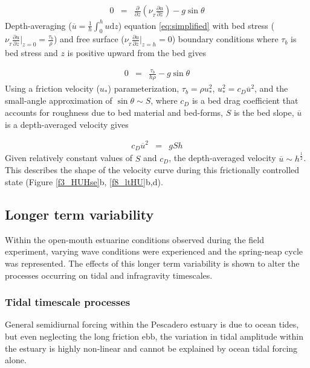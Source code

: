 \begin{eqnarray}
0 & = & \frac{\partial}{\partial z}\left(\nu_{_{T}}\frac{\partial u}{\partial z}\right)-g\sin\theta\label{eq:simplified}
\end{eqnarray}
Depth-averaging ($\overline{u}=\frac{1}{h}\int_{0}^{h}u\mathrm{d}z$)
equation \ref{eq:simplified} with bed stress ($\nu_{_{T}}\frac{\partial u}{\partial z}\Bigr|_{z=0}=\frac{\tau_{b}}{\rho}$)
and free surface ($\nu_{_{T}}\frac{\partial u}{\partial z}\Bigr|_{z=h}=0$)
boundary conditions where $\tau_{b}$ is bed stress and $z$ is positive
upward from the bed gives

\begin{eqnarray}
0 & = & \frac{\tau_{b}}{h\rho}-g\sin\theta\label{eq:fc_w_taubed}
\end{eqnarray}
Using a friction velocity ($u_{*}$) parameterization, $\tau_{b}=\rho u_{*}^{2}$,
$u_{*}^{2}=c_{D}\overline{u}^{2}$, and the small-angle approximation
of $\sin\theta\sim S$, where $c_{D}$ is a bed drag coefficient that
accounts for roughness due to bed material and bed-forms, $S$ is
the bed slope, $\overline{u}$ is a depth-averaged velocity gives

\begin{eqnarray}
c_{D}\overline{u}^{2} & = & gSh\label{eq:frictionalcontrol}
\end{eqnarray}
 Given relatively constant values of $S$ and $c_{D}$, the depth-averaged
velocity $\overline{u}\sim h^{\frac{1}{2}}$. This describes the shape
of the velocity curve during this frictionally controlled state (Figure
\ref{f3_HUHse}b, \ref{f8_ltHU}b,d).


\subsection{Longer term variability}

Within the open-mouth estuarine conditions observed during the field
experiment, varying wave conditions were experienced and the spring-neap
cycle was represented. The effects of this longer term variability
is shown to alter the processes occurring on tidal and infragravity
timescales. 


\subsubsection{Tidal timescale processes}

General semidiurnal forcing within the Pescadero estuary is due to
ocean tides, but even neglecting the long friction ebb, the variation
in tidal amplitude within the estuary is highly non-linear and cannot
be explained by ocean tidal forcing alone. 

